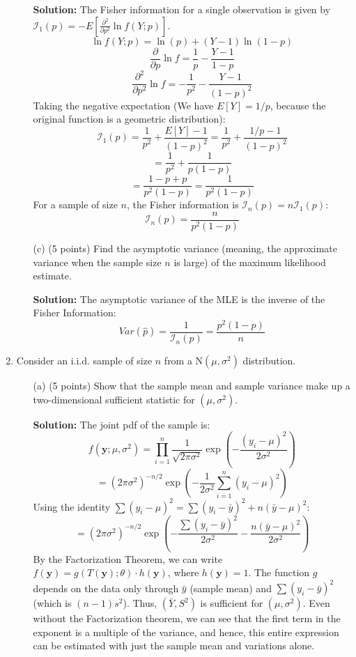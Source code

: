 \documentclass[12pt,letterpaper]{article}
\begin{document}
\begin{enumerate}[leftmargin=*]
\begin{itemize}
    \textbf{Solution:}
    The Fisher information for a single observation is given by $\mathcal{I}_1(p) = -E\left[ \frac{\partial^2}{\partial p^2} \ln f(Y;p) \right]$.
    \[ \ln f(Y;p) = \ln(p) + (Y-1)\ln(1-p) \]
    \[ \frac{\partial}{\partial p} \ln f = \frac{1}{p} - \frac{Y-1}{1-p} \]
    \[ \frac{\partial^2}{\partial p^2} \ln f = -\frac{1}{p^2} - \frac{Y-1}{(1-p)^2} \]
    Taking the negative expectation (We have $E[Y] = 1/p$, because the original function is a geometric distribution):
    \[ \mathcal{I}_1(p) = \frac{1}{p^2} + \frac{E[Y]-1}{(1-p)^2} = \frac{1}{p^2} + \frac{1/p - 1}{(1-p)^2} \]
    \[ = \frac{1}{p^2} + \frac{1}{p(1-p)} \]
    \[ = \frac{1-p+p}{p^2(1-p)} = \frac{1}{p^2(1-p)} \]
    For a sample of size $n$, the Fisher information is $\mathcal{I}_n(p) = n \mathcal{I}_1(p)$:
    \[ \mathcal{I}_n(p) = \frac{n}{p^2(1-p)} \]
    
    \item [(c)] (5 points) Find the asymptotic variance (meaning, the approximate variance when the sample size $n$ is large) of the maximum likelihood estimate.
    
    \textbf{Solution:}
    The asymptotic variance of the MLE is the inverse of the Fisher Information:
    \[ Var(\hat{p}) = \frac{1}{\mathcal{I}_n(p)} = \frac{p^2(1-p)}{n} \]
\end{itemize} 

\item Consider an i.i.d. sample of size $n$ from a $\text{N}(\mu, \sigma^2)$ distribution.
\begin{itemize}
    \item [(a)] (5 points) Show that the sample mean and sample variance make up a two-dimensional sufficient statistic for $(\mu, \sigma^2)$.
    
    \textbf{Solution:}
    The joint pdf of the sample is:
    \[ f(\textbf{y}; \mu, \sigma^2) = \prod_{i=1}^n \frac{1}{\sqrt{2\pi\sigma^2}} \exp\left(-\frac{(y_i-\mu)^2}{2\sigma^2}\right) \]
    \[ = (2\pi\sigma^2)^{-n/2} \exp\left( -\frac{1}{2\sigma^2} \sum_{i=1}^n (y_i - \mu)^2 \right) \]
    Using the identity $\sum (y_i - \mu)^2 = \sum (y_i - \bar{y})^2 + n(\bar{y} - \mu)^2$:
    \[ = (2\pi\sigma^2)^{-n/2} \exp\left( -\frac{\sum (y_i - \bar{y})^2}{2\sigma^2} - \frac{n(\bar{y} - \mu)^2}{2\sigma^2} \right) \]
    By the Factorization Theorem, we can write $f(\textbf{y}) = g(T(\textbf{y}); \theta) \cdot h(\textbf{y})$, where $h(\textbf{y})=1$. The function $g$ depends on the data only through $\bar{y}$ (sample mean) and $\sum (y_i - \bar{y})^2$ (which is $(n-1)s^2$). Thus, $(\bar{Y}, S^2)$ is sufficient for $(\mu, \sigma^2)$. Even without the Factorization theorem, we can see that the first term in the exponent is a multiple of the variance, and hence, this entire expression can be estimated with just the sample mean and variations alone.


\end{itemize}
\end{enumerate}
\end{document}
